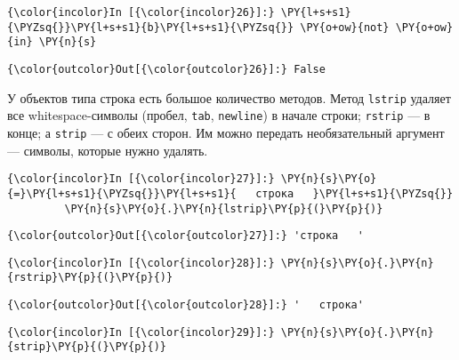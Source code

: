     \begin{Verbatim}[commandchars=\\\{\}]
{\color{incolor}In [{\color{incolor}26}]:} \PY{l+s+s1}{\PYZsq{}}\PY{l+s+s1}{b}\PY{l+s+s1}{\PYZsq{}} \PY{o+ow}{not} \PY{o+ow}{in} \PY{n}{s}
\end{Verbatim}

            \begin{Verbatim}[commandchars=\\\{\}]
{\color{outcolor}Out[{\color{outcolor}26}]:} False
\end{Verbatim}
        
    У объектов типа строка есть большое количество методов. Метод
\texttt{lstrip} удаляет все whitespace-символы (пробел, \texttt{tab},
\texttt{newline}) в начале строки; \texttt{rstrip} --- в конце; а
\texttt{strip} --- с обеих сторон. Им можно передать необязательный
аргумент --- символы, которые нужно удалять.

    \begin{Verbatim}[commandchars=\\\{\}]
{\color{incolor}In [{\color{incolor}27}]:} \PY{n}{s}\PY{o}{=}\PY{l+s+s1}{\PYZsq{}}\PY{l+s+s1}{   строка   }\PY{l+s+s1}{\PYZsq{}}
         \PY{n}{s}\PY{o}{.}\PY{n}{lstrip}\PY{p}{(}\PY{p}{)}
\end{Verbatim}

            \begin{Verbatim}[commandchars=\\\{\}]
{\color{outcolor}Out[{\color{outcolor}27}]:} 'строка   '
\end{Verbatim}
        
    \begin{Verbatim}[commandchars=\\\{\}]
{\color{incolor}In [{\color{incolor}28}]:} \PY{n}{s}\PY{o}{.}\PY{n}{rstrip}\PY{p}{(}\PY{p}{)}
\end{Verbatim}

            \begin{Verbatim}[commandchars=\\\{\}]
{\color{outcolor}Out[{\color{outcolor}28}]:} '   строка'
\end{Verbatim}
        
    \begin{Verbatim}[commandchars=\\\{\}]
{\color{incolor}In [{\color{incolor}29}]:} \PY{n}{s}\PY{o}{.}\PY{n}{strip}\PY{p}{(}\PY{p}{)}
\end{Verbatim}

